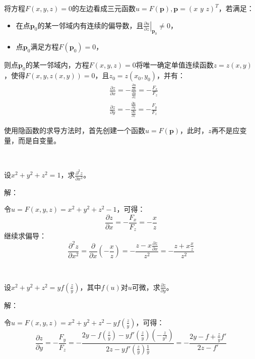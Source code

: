 \begin{theorem}[二元隐函数求导定理]
将方程$F\left( x,y,z \right) =0$的左边看成三元函数$u=F\left( \boldsymbol{p} \right) ,\boldsymbol{p}=\left( x\,\,y\,\,z \right) ^T$，若满足：
\begin{itemize}
    \item 在点$\boldsymbol{p}_0$的某一邻域内有连续的偏导数，且$\left. \frac{\partial u}{\partial z} \right|_{\boldsymbol{p}_0}\ne 0$，
    \item 点$\boldsymbol{p}_0$满足方程$F\left( \boldsymbol{p}_0 \right) =0$，
\end{itemize}
则点$\boldsymbol{p}_0$的某一邻域内，方程$F\left( x,y,z \right) =0$将唯一确定单值连续函数$z=z\left( x,y \right) $，使得$F\left( x,y,z\left( x,y \right) \right) =0$，且$z_0=z\left( x_0,y_0 \right) $，并有：
\begin{align*}
&\frac{\partial z}{\partial x}=-\frac{\frac{\partial u}{\partial x}}{\frac{\partial u}{\partial z}}=-\frac{F_x}{F_z} \\
&\frac{\partial z}{\partial y}=-\frac{\frac{\partial u}{\partial y}}{\frac{\partial u}{\partial z}}=-\frac{F_y}{F_z}
\end{align*}
\end{theorem}

使用隐函数的求导方法时，首先创建一个函数$u=F\left( \boldsymbol{p} \right) $，此时，$z$再不是应变量，而是自变量。

~

\begin{example}
设$x^2+y^2+z^2=1$，求$\frac{\partial ^2z}{\partial x^2}$。
\end{example}

解：

令$u=F\left( x,y,z \right) =x^2+y^2+z^2-1$，可得：
\[
\frac{\partial z}{\partial x}=-\frac{F_x}{F_z}=-\frac{x}{z}
\]
继续求偏导：
\[
\frac{\partial ^2z}{\partial x^2}=\frac{\partial}{\partial x}\left( -\frac{x}{z} \right) =-\frac{z-x\frac{\partial z}{\partial x}}{z^2}=-\frac{z+x\frac{x}{z}}{z^2}
\]

~

\begin{example}
    设$x^2+y^2+z^2=yf\left( \frac{z}{y} \right) $，其中$f\left( u \right) $对$u$可微，求$\frac{\partial z}{\partial y}$。
\end{example}

解：

令$u=F\left( x,y,z \right) =x^2+y^2+z^2-yf\left( \frac{z}{y} \right) $，可得：
\[
\frac{\partial z}{\partial y}=-\frac{F_y}{F_z}=-\frac{2y-f\left( \frac{z}{y} \right) -yf'\left( \frac{z}{y} \right) \left( -\frac{z}{y^2} \right)}{2z-yf'\left( \frac{z}{y} \right) \frac{1}{y}}=-\frac{2y-f+\frac{z}{y}f'}{2z-f'}
\]

